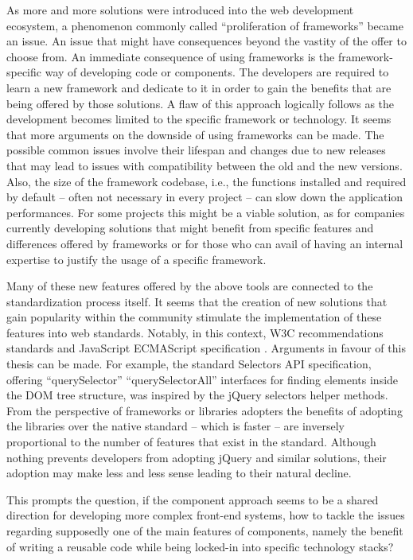 As more and more solutions were introduced into the web development ecosystem, a phenomenon commonly called “proliferation of frameworks” became an issue. An issue that might have consequences beyond the vastity of the offer to choose from.
An immediate consequence of using frameworks is the framework-specific way of developing code or components. The developers are required to learn a new framework and dedicate to it in order to gain the benefits that are being offered by those solutions. A flaw of this approach logically follows as the development becomes limited to the specific framework or technology. It seems that more arguments on the downside of using frameworks can be made. The possible common issues involve their lifespan and changes due to new releases that may lead to issues with compatibility between the old and the new versions. Also, the size of the framework codebase, i.e., the functions installed and required by default – often not necessary in every project – can slow down the application performances.
For some projects this might be a viable solution, as for companies currently developing solutions that might benefit from specific features and differences offered by frameworks or for those who can avail of having an internal expertise to justify the usage of a specific framework.

Many of these new features offered by the above tools are connected to the standardization process itself. It seems that the creation of new solutions that gain popularity within the community stimulate the implementation of these features into web standards. Notably, in this context, W3C recommendations standards and JavaScript ECMAScript specification . Arguments in favour of this thesis can be made. For example, the standard Selectors API specification, offering “querySelector” “querySelectorAll” interfaces for finding elements inside the DOM tree structure, was inspired by the jQuery selectors helper methods. From the perspective of frameworks or libraries adopters the benefits of adopting the libraries over the native standard – which is faster – are inversely proportional to the number of features that exist in the standard. Although nothing prevents developers from adopting jQuery and similar solutions, their adoption may make less and less sense leading to their natural decline.

This prompts the question, if the component approach seems to be a shared direction for developing more complex front-end systems, how to tackle the issues regarding supposedly one of the main features of components, namely the benefit of writing a reusable code while being locked-in into specific technology stacks?

